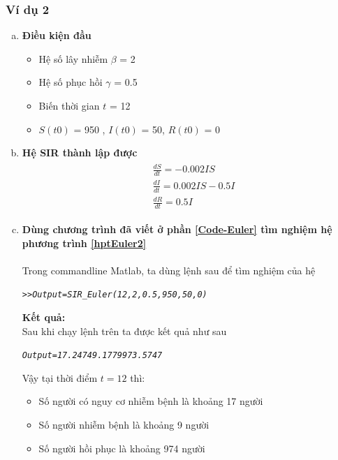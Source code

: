 \subsubsection{Ví dụ 2}\label{vd2-ppEuler}
\begin{enumerate}[a)]
\item \textbf{Điều kiện đầu}
	\begin{itemize}
		\item Hệ số lây nhiễm $ \beta $ = 2
		\item Hệ số phục hồi $ \gamma $ = 0.5
		\item Biến thời gian $ t $ = 12
		\item $ S(t0) $ = 950 , $ I(t0) $ = 50, $ R(t0) $ = 0
	\end{itemize}

\item \textbf {Hệ SIR thành lập được}
	\begin{align} \label{hptEuler2} \tag{II}
	    \begin{split} 
	        &\frac{dS}{dt} = -0.002IS \\
	        &\frac{dI}{dt} = 0.002IS - 0.5I \\
	        &\frac{dR}{dt} = 0.5I
	    \end{split}
	\end{align}
\item \textbf{Dùng chương trình đã viết ở phần \ref{Code-Euler} tìm nghiệm hệ phương trình \eqref{hptEuler2} }\\
	\\Trong commandline Matlab, ta dùng lệnh sau để tìm nghiệm của hệ
	\begin{mdframed}[hidealllines=true,backgroundcolor=magenta!10]
	\begin{alltt}
	\textit{
	>> Output = SIR_Euler(12,2,0.5,950,50,0)
	}
	\end{alltt}
	\end{mdframed}
	
	\textbf{Kết quả:}\\
	Sau khi chạy lệnh trên ta được kết quả như sau
	\begin{mdframed}[hidealllines=true,backgroundcolor=blue!10]
	\begin{alltt}
	\textit{
	 Output = 17.2474    9.1779  973.5747
	}
	\end{alltt}
	\end{mdframed}
	Vậy tại thời điểm $ t = 12 $ thì:
	\begin{itemize}
		\item Số người có nguy cơ nhiễm bệnh là khoảng 17 người
		\item Số người nhiễm bệnh là khoảng 9 người
		\item Số người hồi phục là khoảng 974 người
	\end{itemize}


\end{enumerate}
